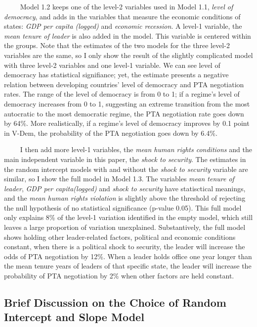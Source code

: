 \documentclass[12pt,]{article}
\begin{document}
\(\qquad\) Model 1.2 keeps one of the level-2 variables used in Model
1.1, \emph{level of democracy}, and adds in the variables that measure
the economic conditions of states: \emph{GDP per capita (logged)} and
\emph{economic recession}. A level-1 variable, the \emph{mean tenure of
leader} is also added in the model. This variable is centered within the
groups. Note that the estimates of the two models for the three level-2
variables are the same, so I only show the result of the slightly
complicated model with three level-2 variables and one level-1 variable.
We can see level of democracy has statistical signifiance; yet, the
estimate presents a negative relation between developing countries'
level of democracy and PTA negotiation rates. The range of the level of
democracy is from 0 to 1; if a regime's level of democracy increases
from 0 to 1, suggesting an extreme transition from the most autocratic
to the most democratic regime, the PTA negotiation rate goes down by
64\%. More realistically, if a regime's level of democracy improves by
0.1 point in V-Dem, the probability of the PTA negotiation goes down by
6.4\%.

\(\qquad\) I then add more level-1 variables, the \emph{mean human
rights conditions} and the main independent variable in this paper, the
\emph{shock to security}. The estimates in the random intercept models
with and without the \emph{shock to security} variable are similar, so I
show the full model in Model 1.3. The variables \emph{mean tenure of
leader}, \emph{GDP per capita(logged)} and \emph{shock to security} have
statisctical meanings, and the \emph{mean human rights violation} is
slightly above the threshold of rejecting the null hypothesis of no
statistical significance (p-value 0.05). This full model only explains
8\% of the level-1 variation identified in the empty model, which still
leaves a large proportion of variation unexplained. Substantively, the
full model shows holding other leader-related factors, political and
economic conditions constant, when there is a political shock to
security, the leader will increase the odds of PTA negotiation by 12\%.
When a leader holds office one year longer than the mean tenure years of
leaders of that specific state, the leader will increase the probability
of PTA negotiation by 2\% when other factors are held constant.

\subsection{Brief Discussion on the Choice of Random Intercept and Slope
Model}\label{brief-discussion-on-the-choice-of-random-intercept-and-slope-model}
\end{document}
